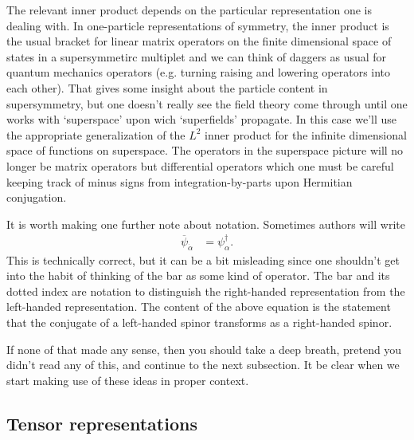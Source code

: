 \documentclass[12pt, oneside]{report}    %
\begin{document}
The relevant inner product depends on the particular representation one is dealing with. 
In one-particle representations of symmetry, the inner product is the usual bracket for linear matrix operators on the finite dimensional space of states in a supersymmetirc multiplet and we can think of daggers as usual for quantum mechanics operators (e.g. turning raising and lowering operators into each other). That gives  some insight about the particle content in supersymmetry, but one doesn't really see the field theory come through until one works with `superspace' upon wich `superfields' propagate. In this case we'll use the appropriate generalization of the $L^2$ inner product for the infinite dimensional space of functions on superspace. The operators in the superspace picture will no longer be matrix operators but differential operators which one must be careful keeping track of minus signs from integration-by-parts upon Hermitian conjugation.

It is worth making one further note about notation. Sometimes authors will write
\begin{align}
    \overline\psi_{\dot\alpha} &= \psi^\dag_\alpha.
\end{align}
This is technically correct, but it can be a bit misleading since one shouldn't get into the habit of thinking of the bar as some kind of operator. The bar and its dotted index are notation to distinguish the right-handed representation from the left-handed representation. The content of the above equation is the statement that the conjugate of a left-handed spinor transforms as a right-handed spinor.

If none of that made any sense, then you should take a deep breath, pretend you didn't read any of this, and continue to the next subsection. It be clear when we start making use of these ideas in proper context.

\subsection{Tensor representations}
\end{document}
